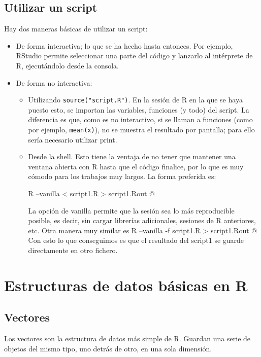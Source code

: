 \documentclass{config/apuntes}\usepackage[]{graphicx}\usepackage[]{xcolor}
\newcommand{\code}[1]{\texttt{#1}}
\begin{document}
\section{Utilizar un script}
Hay dos maneras básicas de utilizar un script:
\begin{itemize}
\item De forma interactiva; lo que se ha hecho hasta entonces. Por ejemplo, RStudio permite seleccionar una parte del código y lanzarlo al intérprete de R, ejecutándolo desde la consola.
\item De forma no interactiva:
\begin{itemize}
\item Utilizando \code{source("script.R")}. En la sesión de R en la que se haya puesto esto, se importan las variables, funciones (y todo) del script. La diferencia es que, como es no interactivo, si se llaman a funciones (como por ejemplo, \code{mean(x)}), no se muestra el resultado por pantalla; para ello sería necesario utilizar print. 
\item Desde la shell. Esto tiene la ventaja de no tener que mantener una ventana abierta con R hasta que el código finalice, por lo que es muy cómodo para los trabajos muy largos. La forma preferida es:

\verb@ R --vanilla < script1.R > script1.Rout @

La opción de vanilla permite que la sesión sea lo más reproducible posible, es decir, sin cargar librerías adicionales, sesiones de R anteriores, etc. Otra manera muy similar es \verb@ R --vanilla -f script1.R > script1.Rout @ Con esto lo que conseguimos es que el resultado del script1 se guarde directamente en otro fichero. 
\end{itemize}
\end{itemize}

\chapter{Estructuras de datos básicas en R}
\section{Vectores}
Los vectores son la estructura de datos más simple de R. Guardan una serie de objetos del mismo tipo, uno detrás de otro, en una sola dimensión.
\end{document}
